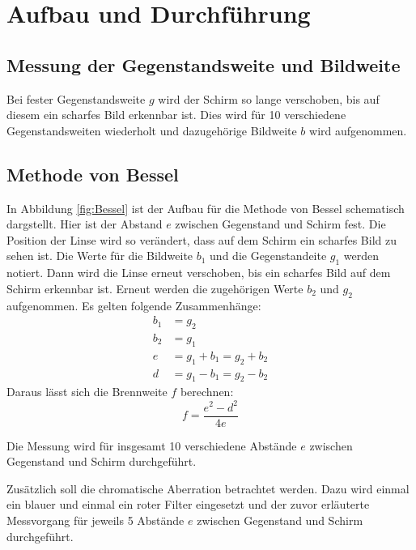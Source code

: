 \section {Aufbau und Durchführung}
\label{sec:durchführung}
\subsection{Messung der Gegenstandsweite und Bildweite}
Bei fester Gegenstandsweite $g$ wird der Schirm so lange verschoben, bis auf diesem ein scharfes Bild erkennbar ist. Dies wird für 10 verschiedene Gegenstandsweiten wiederholt und dazugehörige Bildweite $b$ wird aufgenommen.

\subsection{Methode von Bessel}
In Abbildung \ref{fig:Bessel} ist der Aufbau für die Methode von Bessel schematisch dargstellt. Hier ist der Abstand $e$ zwischen Gegenstand und Schirm fest. Die Position der Linse wird so verändert, dass auf dem Schirm ein scharfes Bild zu sehen ist. Die Werte für die Bildweite $b_1$ und die Gegenstandeite $g_1$ werden notiert. Dann wird die Linse erneut verschoben, bis ein scharfes Bild auf dem Schirm erkennbar ist. Erneut werden die zugehörigen Werte $b_2$ und $g_2$ aufgenommen.
Es gelten folgende Zusammenhänge:
\begin{align}
  b_1 &= g_2 \\
  b_2 &= g_1 \\
  e &= g_1+b_1 =g_2+b_2 \\
  d &= g_1 - b_1 = g_2 -b_2
\end{align}
Daraus lässt sich die Brennweite $f$ berechnen:
\begin{equation}
  f = \frac{e^2 - d^2}{4e}
\end{equation}

Die Messung wird für insgesamt 10 verschiedene Abstände $e$ zwischen Gegenstand und Schirm durchgeführt.

Zusätzlich soll die chromatische Aberration betrachtet werden. Dazu wird einmal ein blauer und einmal ein roter Filter eingesetzt und der zuvor erläuterte Messvorgang für jeweils 5 Abstände $e$ zwischen Gegenstand und Schirm durchgeführt.

